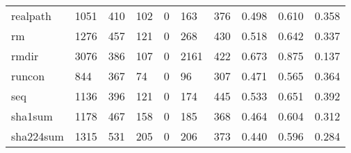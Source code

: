\begin{longtable}{lp{2.0cm}p{2.0cm}p{2.0cm}p{2.0cm}p{2.0cm}p{2.0cm}p{2.0cm}p{2.0cm}p{2.0cm}}
realpath  &                   1051 &                                410 &                               102 &                                0 &                               163 &                             376 &                                   0.498 &                                  0.610 &                                0.358 \\
rm        &                   1276 &                                457 &                               121 &                                0 &                               268 &                             430 &                                   0.518 &                                  0.642 &                                0.337 \\
rmdir     &                   3076 &                                386 &                               107 &                                0 &                              2161 &                             422 &                                   0.673 &                                  0.875 &                                0.137 \\
runcon    &                    844 &                                367 &                                74 &                                0 &                                96 &                             307 &                                   0.471 &                                  0.565 &                                0.364 \\
seq       &                   1136 &                                396 &                               121 &                                0 &                               174 &                             445 &                                   0.533 &                                  0.651 &                                0.392 \\
sha1sum   &                   1178 &                                467 &                               158 &                                0 &                               185 &                             368 &                                   0.464 &                                  0.604 &                                0.312 \\
sha224sum &                   1315 &                                531 &                               205 &                                0 &                               206 &                             373 &                                   0.440 &                                  0.596 &                                0.284 \\

\end{longtable}
